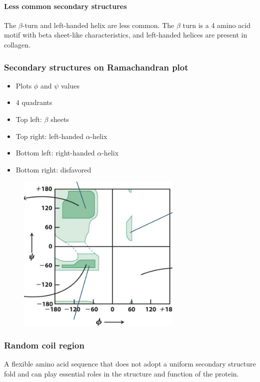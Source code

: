 \documentclass[letterpaper, 12pt]{article}
\begin{document}
\paragraph{Less common secondary structures} The $\beta$-turn and left-handed helix are less common. The $\beta$ turn is a 4 amino acid motif with beta sheet-like characteristics, and left-handed helices are present in collagen.

\subsubsection*{Secondary structures on Ramachandran plot}

\begin{itemize}
\item Plots $\phi$ and $\psi$ values
\item 4 quadrants
\item Top left: $\beta$ sheets
\item Top right: left-handed $\alpha$-helix
\item Bottom left: right-handed $\alpha$-helix
\item Bottom right: disfavored
\end{itemize}

\begin{figure}[H]
\centering
\includegraphics[width=0.7\textwidth]{ramachandran}
\end{figure}

\subsubsection*{Random coil region}
A flexible amino acid sequence that does not adopt a uniform secondary structure fold and can play essential roles in the structure and function of the protein.
\end{document}
